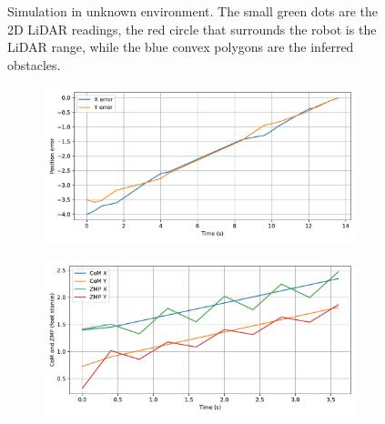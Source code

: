 \begin{figure}[H]
\begin{subfigure}{0.30\textwidth}
    \end{subfigure}
    \caption[short]{Simulation in unknown environment. The small green dots are the 2D LiDAR readings, the red circle that surrounds the robot is the LiDAR range, while the blue convex polygons are the inferred obstacles.}
    \label{fig:unk_env_frames}
\end{figure}
\thispagestyle{empty}

\begin{figure}[H]
    \centering
    \begin{subfigure}{0.45\linewidth}
        \centering
        \includegraphics[width=\linewidth]{figures/Simulations/sim2unkenv/evolution_0.pdf}
    \end{subfigure}
    \begin{subfigure}{0.45\linewidth}
        \centering
        \includegraphics[width=\linewidth]{figures/Simulations/sim2unkenv/evolution_4.pdf}
    \end{subfigure}
    \hfill
    \begin{subfigure}{0.45\linewidth}

\end{subfigure}
\end{figure}
